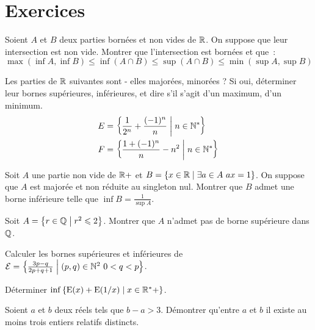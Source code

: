 \clearpage

\section{Exercices}

\begin{exercice}
  Soient \(A\) et \(B\) deux parties bornées et non vides de \(\mathbb{R}\). On suppose 
  que leur intersection est non vide. Montrer que l'intersection est bornées et 
  que~:
  \[\max(\inf A, \inf B) \leqslant \inf(A \cap B) \leqslant \sup(A \cap B) 
  \leqslant \min(\sup A, \sup B)\]
\end{exercice}

\begin{exercice}
  Les parties de \(\mathbb{R}\) suivantes sont - elles majorées, minorées ? Si oui, 
  déterminer leur bornes supérieures, inférieures, et dire s'il s'agit d'un 
  maximum, d'un minimum.
  \begin{align*}
    E &= \left\{\frac{1}{2^n} + \frac{( - 1)^n}{n}\mathrel{}\middle|\mathrel{}n \in \mathbb{N}^*\right\} \\
    F &= \left\{\frac{1 + ( - 1)^n}{n} - n^2\mathrel{}\middle|\mathrel{}n \in \mathbb{N}^*\right\}
  \end{align*}
\end{exercice}

\begin{exercice}
  Soit \(A\) une partie non vide de \(\mathbb{R} + \) et \(B = \left\{x \in \mathbb{R}\mathrel{}\middle|\mathrel{}\exists 
  a \in A \ ax = 1\right\}\). On suppose que \(A\) est majorée et non réduite au 
  singleton nul. Montrer que \(B\) admet une borne inférieure telle que \(\inf B 
  = \frac{1}{\sup A}\).
\end{exercice}

\begin{exercice}
  Soit \(A = \left\{r \in \mathbb{Q}\mathrel{}\middle|\mathrel{}r^2 \leqslant 2\right\}\). Montrer que \(A\) n'admet pas 
  de borne supérieure dans \(\mathbb{Q}\).
\end{exercice}

\begin{exercice}
  Calculer les bornes supérieures et inférieures de \(\mathcal{E} = 
  \left\{\frac{3p - q}{2p + q + 1}\mathrel{}\middle|\mathrel{}(p, q) \in \mathbb{N}^2 \ 0 <q<p\right\}\).
\end{exercice}

\begin{exercice}
  Déterminer \(\inf \left\{\operatorname{E}(x) + \operatorname{E}(1/x)\mathrel{}\middle|\mathrel{}x \in \mathbb{R}^* + \right\}\).
\end{exercice}

\begin{exercice}
  Soient \(a\) et \(b\) deux réels tels que \(b - a>3\). Démontrer qu'entre 
  \(a\) et \(b\) il existe au moins trois entiers relatifs distincts.
\end{exercice}

